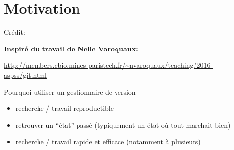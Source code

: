 \documentclass[unknownkeysallowed]{beamer}
\begin{document}
%



\section{Motivation}
\label{sec:motivation}


\begin{frame}{Crédit:}

\textbf{ Inspiré du travail de Nelle Varoquaux:}

\vspace{3cm}

\url{http://members.cbio.mines-paristech.fr/~nvaroquaux/teaching/2016-aspss/git.html}

\end{frame}


\begin{frame}{Pourquoi utiliser un gestionnaire de version}


\begin{itemize}
  \item recherche / travail reproductible
  \vspace{1.3cm}

  \item retrouver un ``état'' passé (typiquement un état où tout marchait bien)

  \vspace{1.3cm}

  \item recherche / travail  rapide et efficace (notamment à plusieurs)
\end{itemize}


\end{frame}
\end{document}
